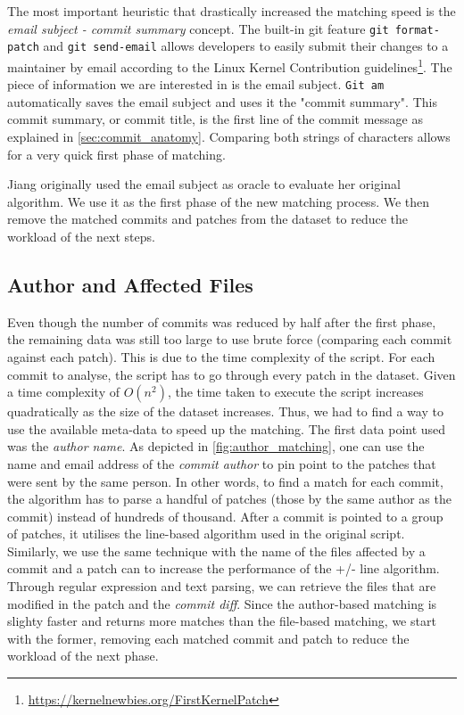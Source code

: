 The most important heuristic that drastically increased the matching speed is the \textit{email subject - commit summary} concept. The built-in git feature \texttt{git format-patch} and \texttt{git send-email} allows developers to easily submit their changes to a maintainer by email according to the Linux Kernel Contribution guidelines\footnote{\url{https://kernelnewbies.org/FirstKernelPatch}}. The piece of information we are interested in is the email subject. \texttt{Git am} automatically saves the email subject and uses it the "commit summary". This commit summary, or commit title, is the first line of the commit message as explained in \autoref{sec:commit_anatomy}. Comparing both strings of characters allows for a very quick first phase of matching.

Jiang originally used the email subject as oracle to evaluate her original algorithm. We use it as the first phase of the new matching process. We then remove the matched commits and patches from the dataset to reduce the workload of the next steps.



\subsection{Author and Affected Files}

Even though the number of commits was reduced by half after the first phase, the remaining data was still too large to use brute force (comparing each commit against each patch). This is due to the time complexity of the script. For each commit to analyse, the script has to go through every patch in the dataset. Given a time complexity of $O(n^2)$, the time taken to execute the script increases quadratically as the size of the dataset increases. Thus, we had to find a way to use the available meta-data to speed up the matching. The first data point used was the \textit{author name}. As depicted in \autoref{fig:author_matching}, one can use the name and email address of the \textit{commit author} to pin point to the patches that were sent by the same person. In other words, to find a match for each commit, the algorithm has to parse a handful of patches (those by the same author as the commit) instead of hundreds of thousand. After a commit is pointed to a group of patches, it utilises the line-based algorithm used in the original script. Similarly, we use the same technique with the name of the files affected by a commit and a patch can to increase the performance of the +/- line algorithm. Through regular expression and text parsing, we can retrieve the files that are modified in the patch and the \textit{commit diff}. Since the author-based matching is slighty faster and returns more matches than the file-based matching, we start with the former, removing each matched commit and patch to reduce the workload of the next phase.

